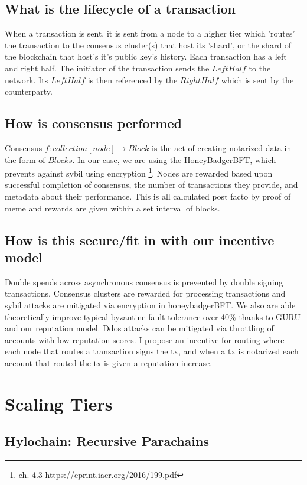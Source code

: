 \documentclass{article}
\begin{document}
\subsection{What is the lifecycle of a transaction}
When a transaction is sent, it is sent from a node to a higher tier which 'routes' the transaction to the consensus cluster(s) that host its 'shard', or the shard of the blockchain that host's it's public key's history. Each transaction has a left and right half. The initiator of the transaction sends the $LeftHalf$ to the network. Its $LeftHalf$ is then referenced by the $RightHalf$ which is sent by the counterparty.

\subsection{How is consensus performed}
Consensus $f: collection[node] \rightarrow  Block$ is the act of creating notarized data in the form of $Blocks$. In our case, we are using the HoneyBadgerBFT, which prevents against sybil using encryption \footnote{ch. 4.3 https://eprint.iacr.org/2016/199.pdf}. Nodes are rewarded based upon successful completion of consensus, the number of transactions they provide, and metadata about their performance. This is all calculated post facto by proof of meme and rewards are given within a set interval of blocks.

\subsection{How is this secure/fit in with our incentive model}
Double spends across asynchronous consensus is prevented by double signing transactions. Consensus clusters are rewarded for processing transactions and sybil attacks are mitigated via encryption in honeybadgerBFT. We also are able theoretically improve typical byzantine fault tolerance over 40\% thanks to GURU and our reputation model. Ddos attacks can be mitigated via throttling of accounts with low reputation scores. I propose an incentive for routing where each node that routes a transaction signs the tx, and when a tx is notarized each account that routed the tx is given a reputation increase.

\section{Scaling Tiers}
\subsection{Hylochain: Recursive Parachains}
\end{document}
